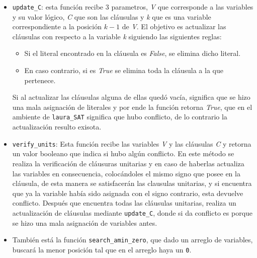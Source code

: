 \documentclass[letterpaper,12pt]{article}
\begin{document}
\begin{itemize}
	\item \texttt{update\_C}: esta función recibe 3 parametros, \textit{V} que corresponde a las variables y su valor lógico, \textit{C} que son las cláusulas y \textit{k} que es una variable correspondiente a la posici\'on $k-1$ de \textit{V}. El objetivo es actualizar las cláusulas con respecto a la variable \textit{k} siguiendo las siguientes reglas:
	
	\begin{itemize}
		\item Si el literal encontrado en la cláusula es \textit{False}, se elimina dicho literal.
		
		\item En caso contrario, si es \textit{True} se elimina toda la cláusula a la que pertenece.
	\end{itemize}
	
	Si al actualizar las cláusulas alguna de ellas quedó vacía, significa que se hizo una mala asignación de literales y por ende la función retorna \textit{True}, que en el ambiente de \texttt{laura\_SAT} significa que hubo conflicto, de lo contrario la actualización resulto exisota. 
	
	\item \texttt{verify\_units}: Esta función recibe las variables \textit{V} y las cláusulas \textit{C} y retorna un valor booleano que indica si hubo algún conflicto. En este método se realiza la verificación de cláusuras unitarias y en caso de haberlas actualiza las variables en consecuencia, colocándoles el mismo signo que posee en la cláusula, de esta manera se satisfacerán las clausulas unitarias, y si encuentra que ya la variable había sido asignada con el signo contrario, esta devuelve conflicto. Después que encuentra todas las cláusulas unitarias, realiza un actualización de cláusulas mediante \texttt{update\_C}, donde si da conflicto es porque se hizo una mala asignación de variables antes. 
	
	\item También está la función \texttt{search\_amin\_zero}, que dado un arreglo de variables, buscará la menor posici\'on tal que en el arreglo haya un \texttt{0}.
	

\end{itemize}
\end{document}
